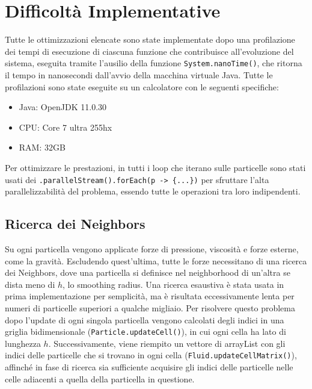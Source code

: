 \section{Difficoltà Implementative}
    Tutte le ottimizzazioni elencate sono state implementate dopo una profilazione
    dei tempi di esecuzione di ciascuna funzione che contribuisce all'evoluzione del sistema,
    eseguita tramite l'ausilio della funzione \texttt{System.nanoTime()}, che ritorna il tempo
    in nanosecondi dall'avvio della macchina virtuale Java. 
    Tutte le profilazioni sono state eseguite su un calcolatore con le seguenti specifiche:
    \begin{itemize}
        \item Java: OpenJDK 11.0.30
        \item CPU: Core 7 ultra 255hx
        \item RAM: 32GB
    \end{itemize}

    Per ottimizzare le prestazioni, in tutti i loop che iterano sulle particelle sono stati usati dei
    \texttt{.parallelStream().forEach(p -> \{...\})} per sfruttare l'alta parallelizzabilità del problema, essendo
    tutte le operazioni tra loro indipendenti.
    
    \subsection{Ricerca dei Neighbors}
        Su ogni particella vengono applicate forze di pressione, viscosità e forze esterne,
        come la gravità. Escludendo quest'ultima, tutte le forze necessitano di una
        ricerca dei Neighbors, dove una particella si definisce nel neighborhood di un'altra
        se dista meno di $h$, lo smoothing radius. Una ricerca esaustiva è stata usata
        in prima implementazione per semplicità, ma è risultata eccessivamente lenta
        per numeri di particelle superiori a qualche migliaio. Per risolvere questo 
        problema dopo l'update di ogni singola particella vengono calcolati degli indici
        in una griglia bidimensionale (\texttt{Particle.updateCell()}), in cui ogni cella ha lato di lunghezza $h$. 
        Successivamente, viene riempito un vettore di arrayList con gli indici delle particelle 
        che si trovano in ogni cella (\texttt{Fluid.updateCellMatrix()}), affinché in fase di ricerca 
        sia sufficiente acquisire gli indici delle particelle nelle celle 
        adiacenti a quella della particella in questione.

